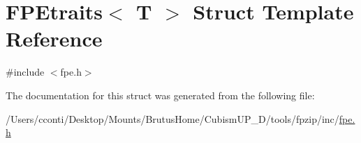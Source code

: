 \hypertarget{struct_f_p_etraits}{}\section{F\+P\+Etraits$<$ T $>$ Struct Template Reference}
\label{struct_f_p_etraits}


{\ttfamily \#include $<$fpe.\+h$>$}



The documentation for this struct was generated from the following file\+:\begin{DoxyCompactItemize}
\item 
/\+Users/cconti/\+Desktop/\+Mounts/\+Brutus\+Home/\+Cubism\+U\+P\+\_\+D/tools/fpzip/inc/\hyperlink{fpe_8h}{fpe.\+h}\end{DoxyCompactItemize}
